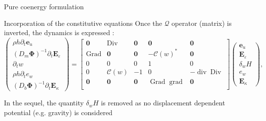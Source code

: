 \documentclass[aspectratio=169]{beamer}
\DeclareMathOperator*{\grad}{grad}
\DeclareMathOperator*{\Grad}{Grad}
\DeclareMathOperator*{\Div}{Div}
\renewcommand{\div}{\operatorname{div}}
\begin{document}
\begin{frame}{Pure coenergy formulation}
	
	\begin{block}{Incorporation of the constitutive equations}
		Once the $\mathcal{Q}$ operator (matrix) is inverted, the dynamics is expressed :
		\begin{equation*}
			\begin{pmatrix}
				\rho h\partial_t \bm{e}_u \\
				(D_m \bm{\Phi})^{-1} \partial_t \bm{E}_\varepsilon \\
				\partial_t w \\
				\rho h\partial_t e_w \\
				(D_b \bm{\Phi})^{-1} \partial_t \bm{E}_\kappa
			\end{pmatrix} = 
			\begin{bmatrix}
				\bm{0} & \Div & \bm{0} & \bm{0} & \bm{0}\\
				\Grad & \bm{0} & \bm{0} & -\mathcal{C}(w)^* & \bm{0} \\
				0 & 0 & 0 & 1 & 0 \\
				0 & \mathcal{C}(w) & -1 & 0 & -\div\Div \\
				\bm{0} & \bm{0} & \bm{0} & \Grad\grad & \bm{0} \\ 
			\end{bmatrix}
			\begin{pmatrix}
				\bm{e}_u \\
				\bm{E}_\varepsilon \\
				\delta_{w} H \\
				e_w \\
				\bm{E}_\kappa
			\end{pmatrix},
		\end{equation*}
		
	\end{block}
	In the sequel, the quantity $\delta_w H$ is removed as no displacement dependent potential (e.g. gravity) is considered
	
\end{frame}
\end{document}
